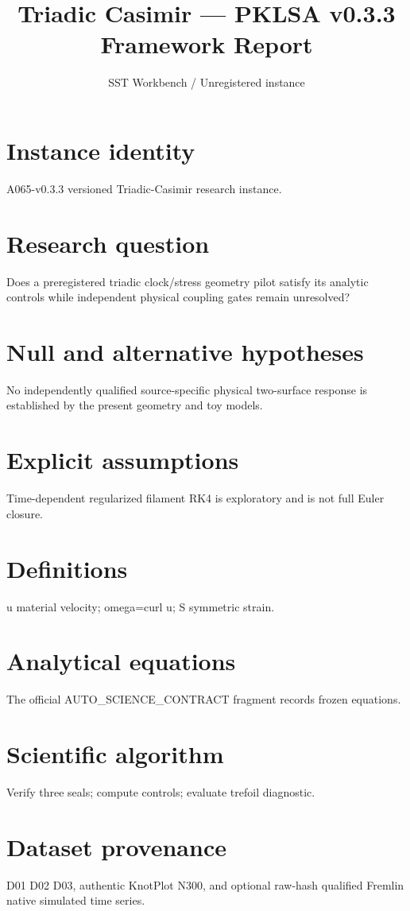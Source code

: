 \documentclass[10pt,a4paper]{article}
\title{Triadic Casimir --- PKLSA v0.3.3 Framework Report}
\author{SST Workbench / Unregistered instance}
\begin{document}
\maketitle
\section{Instance identity}
A065-v0.3.3 versioned Triadic-Casimir research instance.
\section{Research question}
Does a preregistered triadic clock/stress geometry pilot satisfy its analytic controls while independent physical coupling gates remain unresolved?
\section{Null and alternative hypotheses}
No independently qualified source-specific physical two-surface response is established by the present geometry and toy models.
\section{Explicit assumptions}
Time-dependent regularized filament RK4 is exploratory and is not full Euler closure.
\section{Definitions}
u material velocity; omega=curl u; S symmetric strain.
\section{Analytical equations}
The official AUTO\_SCIENCE\_CONTRACT fragment records frozen equations.

\section{Scientific algorithm}
Verify three seals; compute controls; evaluate trefoil diagnostic.
\section{Dataset provenance}
D01 D02 D03, authentic KnotPlot N300, and optional raw-hash qualified Fremlin native simulated time series.
\end{document}
